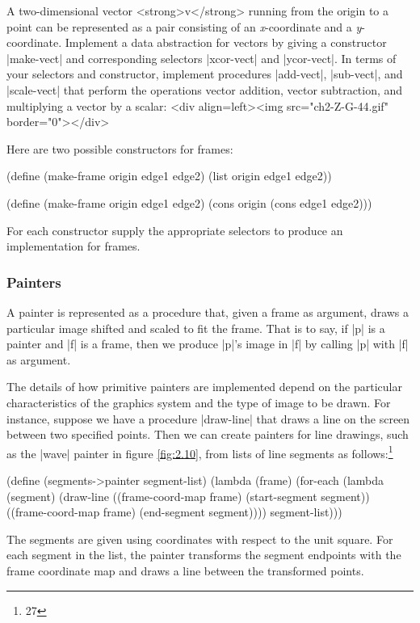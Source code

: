 \begin{Exercise}
\begin{Exercise}
\begin{Exercise}
\begin{Exercise}
\begin{Exercise}
\begin{Exercise}
\label{exc:2.46}
A two-dimensional vector <strong>v</strong> running from the origin to a point
can be represented as a pair
consisting of an \textit{x}-coordinate and a \textit{y}-coordinate.  Implement a data
abstraction for vectors by giving a constructor \scheme|make-vect| and
corresponding selectors \scheme|xcor-vect| and \scheme|ycor-vect|.  In
terms of your selectors and constructor, implement procedures \scheme|add-vect|, \scheme|sub-vect|, and \scheme|scale-vect| that perform
the operations vector addition, vector subtraction, and multiplying a
vector by a scalar:
<div align=left><img src="ch2-Z-G-44.gif" border="0"></div>


\begin{Exercise}
\label{exc:2.47}
Here are two possible constructors for frames:
\begin{schemedisplay}
(define (make-frame origin edge1 edge2)
  (list origin edge1 edge2))

(define (make-frame origin edge1 edge2)
  (cons origin (cons edge1 edge2)))
\end{schemedisplay}
For each constructor supply the appropriate selectors to produce an
implementation for frames.




\subsubsection*{Painters}


A painter is represented as a procedure that, given a frame
as argument, draws a particular image shifted and scaled to fit the frame.
That is to say, if \scheme|p| is a painter and \scheme|f| is a frame, then we
produce \scheme|p|'s image in \scheme|f| by calling \scheme|p| with \scheme|f| as
argument.

The details of how primitive painters are implemented depend on the
particular characteristics of the graphics system and the type of
image to be drawn.  For instance, suppose we have a procedure \scheme|draw-line| that draws a line on the screen between two specified
points.  Then we can create painters for line drawings, such as the
\scheme|wave| painter in figure \ref{fig:2.10}, from lists of line
segments as follows:\footnote{27}\begin{schemedisplay}
(define (segments->painter segment-list)
  (lambda (frame)
    (for-each
     (lambda (segment)
       (draw-line
        ((frame-coord-map frame) (start-segment segment))
        ((frame-coord-map frame) (end-segment segment))))
     segment-list)))
\end{schemedisplay}
The segments are given using coordinates with respect to the unit
square.  For each segment in the list, the painter transforms the
segment endpoints with the frame coordinate map and draws a line
between the transformed points.


\end{Exercise}
\end{Exercise}
\end{Exercise}
\end{Exercise}
\end{Exercise}
\end{Exercise}
\end{Exercise}
